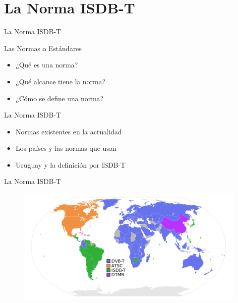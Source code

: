 \section{La Norma ISDB-T}
\begin{frame}{La Norma ISDB-T}
	\begin{block}{Las Normas o Estándares}
	\begin{itemize}
		\item {	¿Qué es una norma?}
		\item { ¿Qué alcance tiene la norma? }
		\item {	¿Cómo se define una norma?	}
	\end{itemize}
	\end{block}
	\begin{block}{La Norma ISDB-T}
	\begin{itemize}
		\item {	Normas existentes en la actualidad}
		\item { Los países y las normas que usan }
		\item {	Uruguay y la definición por ISDB-T	}
	\end{itemize}
	\end{block}
\end{frame}

\begin{frame}{La Norma ISDB-T}
\begin{figure}
	\includegraphics[scale=0.35]{Standards}
\end{figure}

\end{frame}

